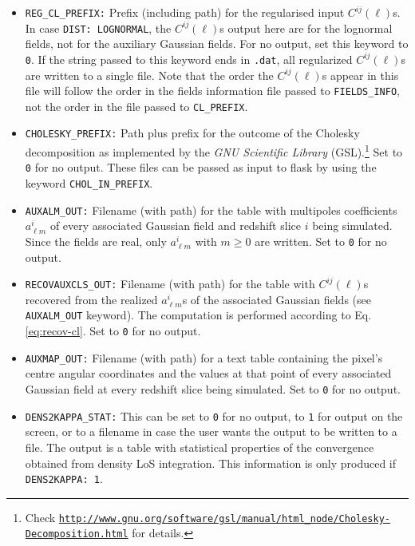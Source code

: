 \documentclass[12pt]{book} %
\begin{document}
\begin{itemize}
\item {\tt REG\_CL\_PREFIX:} Prefix (including path) for the regularised input $C^{ij}(\ell)$s. 
  In case {\tt DIST: LOGNORMAL}, the $C^{ij}(\ell)$s output here are for the lognormal fields, not for 
  the auxiliary Gaussian fields. For no output, set this keyword to {\tt 0}. If the string passed to 
  this keyword ends in {\tt .dat}, all regularized $C^{ij}(\ell)$s are written to a single file. 
  Note that the order the $C^{ij}(\ell)$s appear in this file will follow the order in the fields 
  information file passed to {\tt FIELDS\_INFO}, not the order in the file passed to {\tt CL\_PREFIX}. 

\item {\tt CHOLESKY\_PREFIX:} Path plus prefix for the outcome of the Cholesky decomposition 
  as implemented by the \emph{GNU Scientific Library} 
  (GSL).\footnote{ Check {\tt \href{ http://www.gnu.org/software/gsl/manual/html\_node/Cholesky-Decomposition.html}{http://www.gnu.org/software/gsl/manual/html\_node/Cholesky-Decomposition.html}} for details.} Set to {\tt 0} for no output. 
  These files can be passed as input to {\sc flask} by using the keyword {\tt CHOL\_IN\_PREFIX}.
  
\item {\tt AUXALM\_OUT:} Filename (with path) for the table with multipoles coefficients 
  $a^{i}_{\ell m}$ of every associated Gaussian field and redshift slice $i$ being simulated. 
  Since the fields are real, only $a^{i}_{\ell m}$ with $m\geq 0$ are written.
  Set to {\tt 0} for no output.

\item {\tt RECOVAUXCLS\_OUT:} Filename (with path) for the table with $C^{ij}(\ell)$s recovered 
  from the realized $a^{i}_{\ell m}$s of the associated Gaussian fields (see {\tt AUXALM\_OUT} keyword). 
  The computation is performed according to Eq. \ref{eq:recov-cl}. Set to {\tt 0} for no output.

\item {\tt AUXMAP\_OUT:} Filename (with path) for a text table containing the pixel's centre angular 
  coordinates and the values at that point of every associated Gaussian field at every redshift slice 
  being simulated. Set to {\tt 0} for no output.

\item {\tt DENS2KAPPA\_STAT:} This can be set to {\tt 0} for no output, to {\tt 1} for output 
  on the screen, or to a filename in case the user wants the output to be written to a file. 
  The output is a table with statistical properties of the convergence obtained from density 
  LoS integration. This information is only produced if {\tt DENS2KAPPA: 1}.


\end{itemize}
\end{document}
